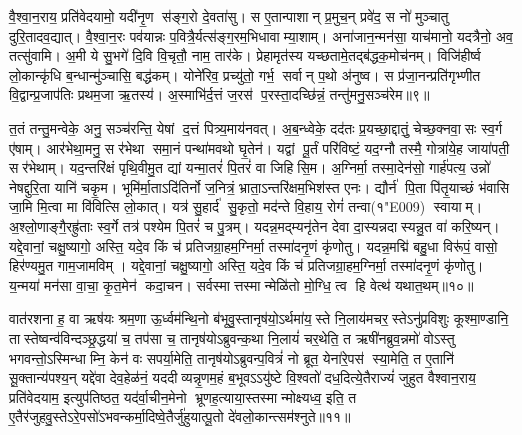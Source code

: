 वै॒श्वा॒न॒राय॒ प्रति॑वेदयामो॒ यदी॑नृ॒ण स॑ङ्ग॒रो दे॒वता॑सु। स ए॒तान्पाशान् प्र॒मुच॒न् प्रवे॑द॒ स नो॑ मुञ्चातु दुरि॒तादव॒द्यात्। वै॒श्वा॒न॒रः पव॑यान्नः प॒वित्रै॒र्यत्स॑ङ्ग॒रम॒भिधावाम्या॒शाम्। अना॑जान॒न्मन॑सा॒ याच॑मानो॒ यदत्रैनो॒ अव॒ तत्सु॑वामि। अ॒मी ये सु॒भगे॑ दि॒वि वि॒चृतौ॒ नाम॒ तार॑के। प्रेहामृत॑स्य यच्छतामे॒तद्ब॑द्धक॒मोच॑नम्। विजि॑हीर्ष्व लो॒कान्कृ॑धि ब॒न्धान्मु॑ञ्चासि॒ बद्ध॑कम्। योने॑रिव॒ प्रच्यु॑तो॒ गर्भ॒ सर्वान् प॒थो अ॑नुष्व। स प्र॑जा॒नन्प्रति॑गृभ्णीत वि॒द्वान्प्र॒जाप॑तिः प्रथम॒जा ऋ॒तस्य॑। अ॒स्माभि॑र्द॒त्तं ज॒रस॑ प॒रस्ता॒दच्छि॑न्नं॒ तन्तु॑मनु॒सञ्च॑रेम॥९॥

त॒तं तन्तु॒मन्वेके॒ अनु॒ सञ्च॑रन्ति॒ येषां द॒त्तं पित्र्य॒माय॑नवत्। अ॒ब॒न्ध्वेके॒ दद॑तः प्र॒यच्छा॒द्दातुं॒ चेच्छ॒क्नवा॒सः स्व॒र्ग ए॑षाम्। आर॑भेथा॒मनु॒ सर॑भेथा समा॒नं पन्था॑मवथो घृ॒तेन॑। यद्वां पू॒र्तं परि॑विष्टं॒ यद॒ग्नौ तस्मै॒ गोत्रा॑ये॒ह जाया॑पती॒ सर॑भेथाम्। यद॒न्तरि॑क्षं पृथि॒वीमु॒त द्यां यन्मा॒तरं॑ पि॒तरं॑ वा जिहिसि॒म। अ॒ग्निर्मा॒ तस्मा॒देन॑सो॒ गार्\mbox{}ह॑पत्य॒ उन्नो॑ नेषद्दुरि॒ता यानि॑ चकृ॒म। भूमि॑र्मा॒ताऽदि॑तिर्नो ज॒नित्रं॒ भ्राता॒ऽन्तरि॑क्षम॒भिश॑स्त एनः। द्यौर्न॑ पि॒ता पि॑तृ॒याच्छं भ॑वासि जा॒मि मि॒त्वा मा वि॑वित्सि लो॒कात्। यत्र॑ सु॒हार्द॑ सु॒कृतो॒ मद॑न्ते वि॒हाय॒ रोगं॑ तन्वा(१\char"E009) स्वायाम्। अ॒श्लो॒णाङ्गै॒रह्रु॑ताः स्व॒र्गे तत्र॑ पश्येम पि॒तरं॑ च पु॒त्रम्। यदन्न॒मद्म्यनृ॑तेन देवा दा॒स्यन्नदास्यन्नु॒त वा॑ करि॒ष्यन्। यद्दे॒वानां॒ चक्षु॒ष्यागो॒ अस्ति॒ यदे॒व किं च॑ प्रतिजग्रा॒हम॒ग्निर्मा॒ तस्मा॑दनृ॒णं कृ॑णोतु। यदन्न॒मद्मि॑ बहु॒धा विरू॑पं॒ वासो॒ हिर॑ण्यमु॒त गाम॒जामविम्। यद्दे॒वानां॒ चक्षु॒ष्यागो॒ अस्ति॒ यदे॒व किं च॑ प्रतिजग्रा॒हम॒ग्निर्मा॒ तस्मा॑दनृ॒णं कृ॑णोतु। य॒न्मया॑ मन॑सा वा॒चा॒ कृ॒त॒मेन॑ कदा॒चन। सर्वस्मात्तस्मान्मेळि॑तो मो॒ग्धि॒ त्व हि वेत्थ॑ यथात॒थम्॥१०॥\anuvakamend

वात॑रशना ह॒ वा ऋष॑यः श्रम॒णा ऊ॒र्ध्वम॑न्थि॒नो ब॑भूवु॒स्तानृष॑यो॒\-ऽर्थमा॑य॒स्ते नि॒लाय॑मचर॒स्तेऽनु॑प्रविशुः कूश्मा॒ण्डानि॒ तास्तेष्वन्व॑विन्दञ्छ्र॒द्धया॑ च॒ तप॑सा च॒ तानृष॑योऽब्रुवन्क॒था नि॒लायं॑ चर॒थेति॒ त ऋषी॑नब्रुव॒न्नमो॑ वोऽस्तु भगवन्तो॒ऽस्मिन्धाम्नि॒ केन॑ वः सपर्या॒मेति॒ तानृष॑योऽब्रुवन्प॒वित्रं॑ नो ब्रूत॒ येना॑रे॒पस॑ स्या॒मेति॒ त ए॒तानि॑ सू॒क्तान्य॑पश्य॒न् यद्दे॑वा देव॒हेळ॑नं॒ यददीव्यन्नृ॒णम॒हं ब॒भूवऽऽयु॑ष्टे वि॒श्वतो॑ दध॒दित्ये॒तैराज्यं॑ जुहुत वैश्वान॒राय॒ प्रति॑वेदयाम॒ इत्युप॑तिष्ठत॒ यद॑र्वा॒चीन॒मेनो भ्रूणह॒त्याया॒\-स्तस्मान्मोक्ष्यध्व॒ इति॒ त ए॒तैर॑जुहवु॒स्तेऽरे॒पसो॑\-ऽभवन्कर्मा॒दिष्वे॒तैर्जु॑हुयात्पू॒तो दे॑वलो॒कान्त्सम॑श्नुते॥११॥\anuvakamend


